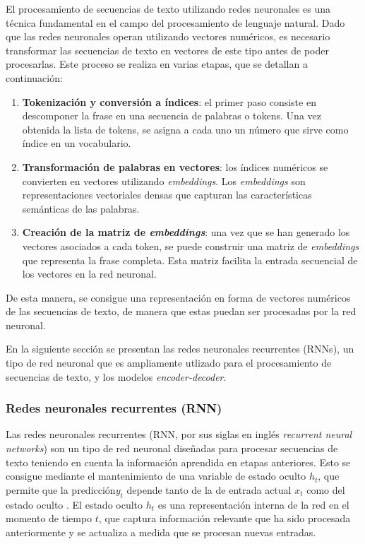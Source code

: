\documentclass[11pt,spanish,listoffigures,listoftables]{tfgetsinf}
\begin{document}

El procesamiento de secuencias de texto utilizando redes neuronales es una técnica fundamental en el campo del procesamiento de lenguaje natural. Dado que las redes neuronales operan utilizando vectores numéricos, es necesario transformar las secuencias de texto en vectores de este tipo antes de poder procesarlas. Este proceso se realiza en varias etapas, que se detallan a continuación:

\begin{enumerate}
	\item \textbf{Tokenización y conversión a índices}: el primer paso consiste en descomponer la frase en una secuencia de palabras o tokens. Una vez obtenida la lista de tokens, se asigna a cada uno un número que sirve como índice en un vocabulario.
	\item \textbf{Transformación de palabras en vectores}: los índices numéricos se convierten en vectores utilizando \textit{embeddings}. Los \textit{embeddings} son representaciones vectoriales densas que capturan las características semánticas de las palabras.
	\item \textbf{Creación de la matriz de \textit{embeddings}}: una vez que se han generado los vectores asociados a cada token, se puede construir una matriz de \textit{embeddings} que representa la frase completa. Esta matriz facilita la entrada secuencial de los vectores en la red neuronal.
\end{enumerate}

De esta manera, se consigue una representación en forma de vectores numéricos de las secuencias de texto, de manera que estas puedan ser procesadas por la red neuronal.

En la siguiente sección se presentan las redes neuronales recurrentes (RNNs), un tipo de red neuronal que es ampliamente utlizado para el procesamiento de secuencias de texto, y los modelos \textit{encoder-decoder}.

\subsubsection{Redes neuronales recurrentes (RNN)} \label{rnn}
Las redes neuronales recurrentes (RNN, por sus siglas en inglés \textit{recurrent neural networks}) son un tipo de red neuronal diseñadas para procesar secuencias de texto teniendo en cuenta la información aprendida en etapas anteriores. Esto se consigue mediante el mantenimiento de una variable de estado oculto $h_t$, que permite que la predicción$y_t$ depende tanto de la de entrada actual $x_t$ como del estado oculto \cite{murphy2022probabilistic}. El estado oculto $h_t$ es una representación interna de la red en el momento de tiempo $t$, que captura información relevante que ha sido procesada anteriormente y se actualiza a medida que se procesan nuevas entradas.
\end{document}
